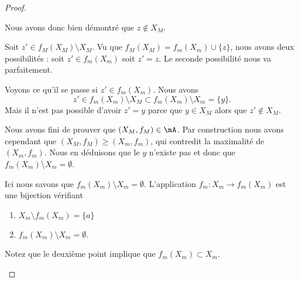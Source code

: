 \begin{proof}
\begin{subproof}
\begin{subproof}
\begin{subproof}
				Nous avons donc bien démontré que \( z\not\in X_M\).

				Soit \( z'\in f_M(X_M)\setminus X_M\). Vu que \( f_M(X_M)=f_m(X_m)\cup\{ z \}\), nous avons deux possibilités : soit \( z'\in f_m(X_m)\) soit \( z'=z\). Le seconde possibilité nous va parfaitement.

				Voyons ce qu'il se passe si \( z'\in f_m(X_m)\). Nous avons
				\begin{equation}
					z'\in f_m(X_m)\setminus X_M\subset f_m(X_m)\setminus X_m=\{ y \}.
				\end{equation}
				Mais il n'est pas possible d'avoir \( z'=y\) parce que \( y\in X_M\) alors que \( z'\not\in X_M\).
			\end{subproof}
			Nous avons fini de prouver que \( (X_M,f_M)\in\mA\). Par construction nous avons cependant que \( (X_M,f_M)\geq (X_m,f_m)\), qui contredit la maximalité de \( (X_m,f_m)\). Nous en déduisons que le \( y\) n'existe pas et donc que \( f_m(X_m)\setminus X_m=\emptyset\).
		\end{subproof}
		\spitem[La suite]
		Ici nous savons que \( f_m(X_m)\setminus X_m=\emptyset\). L'application \(f_m \colon X_m\to f_m(X_m)  \) est une bijection vérifiant
		\begin{enumerate}
			\item
			      \( X_m\setminus f_m(X_m)=\{ a \}\)
			\item
			      \( f_m(X_m)\setminus X_m=\emptyset\).
		\end{enumerate}
		Notez que le deuxième point implique que \( f_m(X_m)\subset X_m\).


\end{subproof}
\end{proof}
